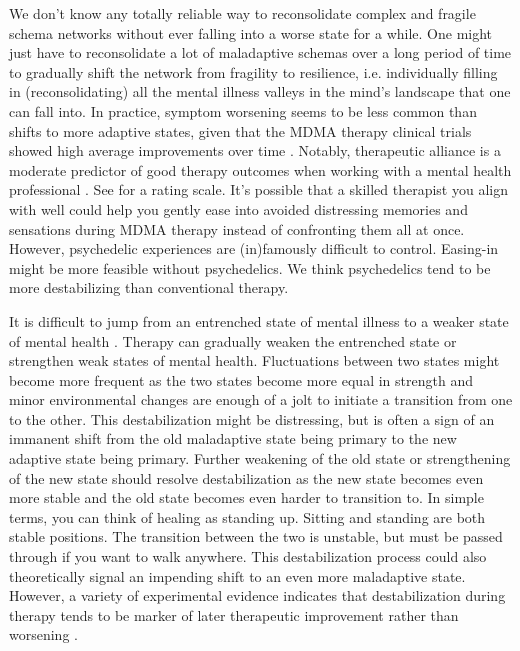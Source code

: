 \documentclass[12pt,letterpaper]{book}
\begin{document}
We don't know any totally reliable way to reconsolidate complex and fragile schema networks without ever falling into a worse state for a while. One might just have to reconsolidate a lot of maladaptive schemas over a long period of time to gradually shift the network from fragility to resilience, i.e. individually filling in (reconsolidating) all the mental illness valleys in the mind's landscape that one can fall into. In practice, symptom worsening seems to be less common than shifts to more adaptive states, given that the MDMA therapy clinical trials showed high average improvements over time \cite{mitchellMDMAClinicalTrial,mitchellMDMAClinicalTrial2}. Notably, therapeutic alliance is a moderate predictor of good therapy outcomes when working with a mental health professional \cite{fluckiger2018alliance}. See \textcite{BRWAIdownload} for a rating scale. It's possible that a skilled therapist you align with well could help you gently ease into avoided distressing memories and sensations during MDMA therapy instead of confronting them all at once. However, psychedelic experiences are (in)famously difficult to control. Easing-in might be more feasible without psychedelics. We think psychedelics tend to be more destabilizing than conventional therapy.

It is difficult to jump from an entrenched state of mental illness to a weaker state of mental health \cite{hayes2020complex}. Therapy can gradually weaken the entrenched state or strengthen weak states of mental health. Fluctuations between two states might become more frequent as the two states become more equal in strength and minor environmental changes are enough of a jolt to initiate a transition from one to the other. This destabilization might be distressing, but is often a sign of an immanent shift from the old maladaptive state being primary to the new adaptive state being primary. Further weakening of the old state or strengthening of the new state should resolve destabilization as the new state becomes even more stable and the old state becomes even harder to transition to. In simple terms, you can think of healing as standing up. Sitting and standing are both stable positions. The transition between the two is unstable, but must be passed through if you want to walk anywhere. This destabilization process could also theoretically signal an impending shift to an even more maladaptive state. However, a variety of experimental evidence indicates that destabilization during therapy tends to be marker of later therapeutic improvement rather than worsening \cite{hayes2020complex,olthofDestabilization}.
\end{document}
